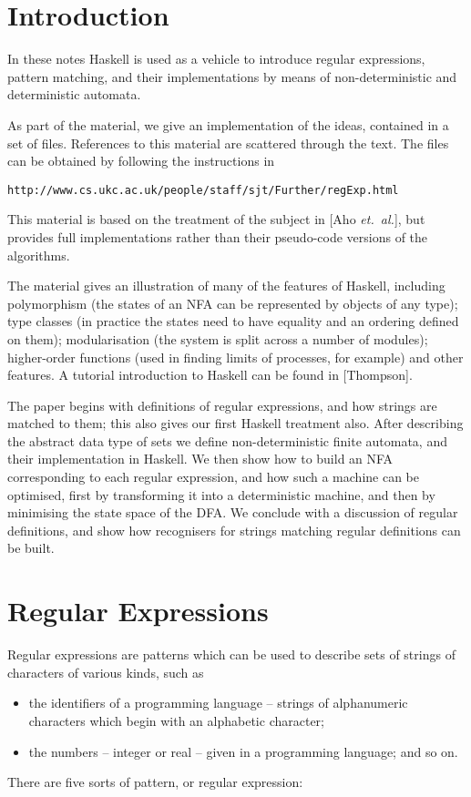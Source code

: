 \documentclass[11pt]{article}
\begin{document}
\tableofcontents


\section{Introduction}
In these notes Haskell is used as a vehicle to introduce regular expressions,
pattern matching, and their implementations by means of non-deterministic and
deterministic automata.

As part of the material, we give an implementation of the ideas, contained in
a set
of files. References to this material are scattered through the text. The
files can be obtained by following the instructions in
\begin{alltt}
http://www.cs.ukc.ac.uk/people/staff/sjt/Further/regExp.html
\end{alltt}

\medskip
\noindent
This material is based on the treatment of the subject in [Aho {\em et.\
al.}], but provides full implementations rather than their pseudo-code
versions of the algorithms. 

The material gives an illustration of many of the features of Haskell,
including polymorphism (the states of an NFA can be represented by objects
of any type); type classes (in practice the states need to have equality and
an ordering defined on them); modularisation (the system is split across a number of
modules); higher-order functions (used in finding limits of processes, for
example) and other features. A tutorial introduction to Haskell can be found
in [Thompson].

The paper begins with definitions of regular expressions, and how strings are
matched to them; this also gives our first Haskell treatment also. After
describing the abstract data type of sets we define non-deterministic finite
automata, and their implementation in Haskell. We then show how to build an
NFA corresponding to each regular expression, and how such a machine can be
optimised, first by transforming it into a deterministic machine, and then by
minimising the state space of the DFA. We conclude with a discussion of
regular definitions, and show how recognisers for strings matching regular
definitions can be built.

\section{Regular Expressions}

Regular expressions are patterns which can be used to describe sets of strings
of characters of various kinds, such as 
\begin{itemize}
\item the identifiers of a programming language
-- strings of alphanumeric characters
which begin with an alphabetic character;
\item the numbers -- integer or real -- given in a programming language; and
so on.
\end{itemize}
There are five sorts of pattern, or regular expression:
\end{document}
